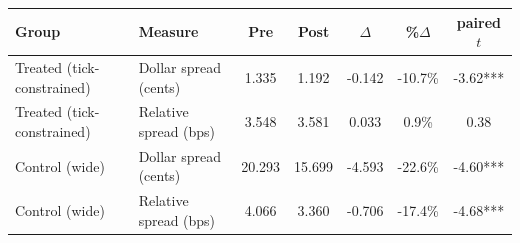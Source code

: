 \begin{tabular}{llccccc}
\toprule
Group & Measure & Pre & Post & $\Delta$ & \%$\Delta$ & paired $t$ \\
\midrule
Treated (tick-constrained) & Dollar spread (cents) & 1.335 & 1.192 & -0.142 & -10.7\% & -3.62*** \\
Treated (tick-constrained) & Relative spread (bps) & 3.548 & 3.581 & 0.033 & 0.9\% & 0.38 \\
Control (wide) & Dollar spread (cents) & 20.293 & 15.699 & -4.593 & -22.6\% & -4.60*** \\
Control (wide) & Relative spread (bps) & 4.066 & 3.360 & -0.706 & -17.4\% & -4.68*** \\
\bottomrule
\end{tabular}